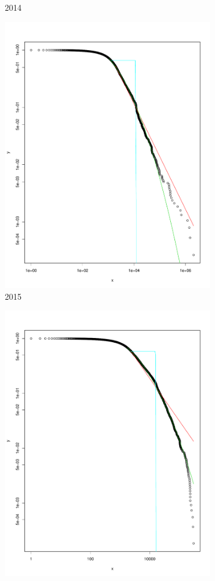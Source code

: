 \documentclass[preprint,12pt]{elsarticle}
\begin{document}
\begin{figure}[H]
\begin{subfigure}{.3\textwidth}
  \caption{2014}
  \label{fig:2014o}
\end{subfigure}
\begin{subfigure}{.3\textwidth}
  \centering
  \includegraphics[width=.8\linewidth]{Bitcoin-graphs/deg-dist-2015-out.pdf}  
  \caption{2015}
  \label{fig:2015o}
\end{subfigure}
\begin{subfigure}{.3\textwidth}
  \centering
  \includegraphics[width=.8\linewidth]{Bitcoin-graphs/deg-dist-2016-out.pdf}  

\end{subfigure}
\end{figure}
\end{document}

